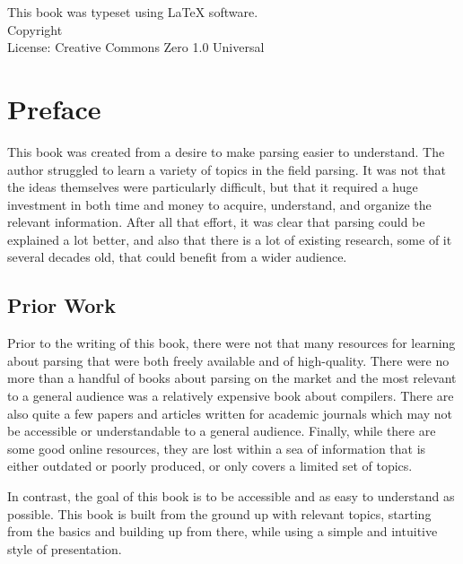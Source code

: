 \documentclass{book}
\makeatletter
\newcommand{\booklicense}{Creative Commons Zero 1.0 Universal}
\newcommand{\bookauthor}{\@author}
\makeatother
\begin{document}
\thispagestyle{empty}

\begin{flushleft}
\vspace*{\fill}
This book was typeset using \LaTeX{} software.\\
\vspace{\fill}
Copyright \textcopyright{} \the\year{}  \bookauthor\\
License: \booklicense
\end{flushleft}

\addtocounter{page}{2}

\chapter*{Preface}
This book was created from a desire to make parsing easier to understand.
The author struggled to learn a variety of topics in the field parsing.
It was not that the ideas themselves were particularly difficult, but that
it required a huge investment in both time and money to acquire, understand,
and organize the relevant information. After all that effort, it was clear
that parsing could be explained a lot better, and also that there is a lot
of existing research, some of it several decades old, that could benefit
from a wider audience.

\section*{Prior Work}
Prior to the writing of this book, there were not that many resources for
learning about parsing that were both freely available and of high-quality.
There were no more than a handful of books about parsing on the market and
the most relevant to a general audience was a relatively expensive book about
compilers. There are also quite a few papers and articles written for academic
journals which may not be accessible or understandable to a general audience.
Finally, while there are some good online resources, they are lost within a sea
of information that is either outdated or poorly produced, or only covers a
limited set of topics. 

In contrast, the goal of this book is to be accessible and as easy to understand
as possible. This book is built from the ground up with relevant topics,
starting from the basics and building up from there, 
while using a simple and intuitive style of presentation.
\end{document}
